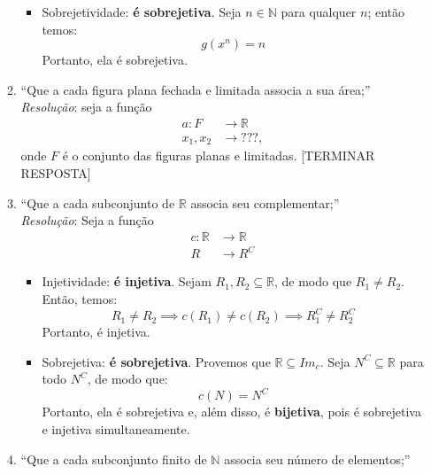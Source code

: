 \documentclass[13pt,letterpaper]{article}
\begin{document}
\begin{enumerate}
\begin{enumerate}
\begin{itemize}
                \item Sobrejetividade: \textbf{é sobrejetiva}. Seja $n \in \mathbb{N}$ para qualquer $n$; então temos:
                \begin{displaymath}
                    g(x^n) = n   
                \end{displaymath}
                Portanto, ela é sobrejetiva.
            \end{itemize}
        \item \enquote{Que a cada figura plana fechada e limitada associa a sua área;}
            \emph{Resolução}: seja a função
                \begin{align*}
                    a: F &\rightarrow \mathbb{R} \\
                    x_1, x_2 &\rightarrow ???,
                \end{align*}
                onde $F$ é o conjunto das figuras planas e limitadas.
                [TERMINAR RESPOSTA]
        \item \enquote{Que a cada subconjunto de $\mathbb{R}$ associa seu complementar;} \\
            \emph{Resolução}: Seja a função
            \begin{align*}
                c: \mathbb{R} &\rightarrow \mathbb{R} \\
                R &\rightarrow R^C
            \end{align*}
            \begin{itemize}
                \item Injetividade: \textbf{é injetiva}. Sejam $R_1, R_2 \subseteq \mathbb{R}$, de modo que $R_1 \ne R_2$. Então, temos:
                \begin{displaymath}
                    R_1 \ne R_2 \implies c(R_1) \ne c(R_2) \implies R_1^C \ne R_2^C
                \end{displaymath}
                Portanto, é injetiva.
                \item Sobrejetiva: \textbf{é sobrejetiva}. Provemos que $\mathbb{R} \subseteq Im_c$. Seja $N^C \subseteq \mathbb{R}$ para todo $N^C$, de modo que:
                \begin{displaymath}
                    c(N) = N^C
                \end{displaymath}
                Portanto, ela é sobrejetiva e, além disso, é \textbf{bijetiva}, pois é sobrejetiva e injetiva simultaneamente.
            \end{itemize}
        \item \enquote{Que a cada subconjunto finito de $\mathbb{N}$ associa seu número de elementos;}\\

\end{enumerate}
\end{enumerate}
\end{document}
